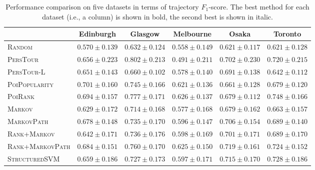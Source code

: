\begin{table}[t]
\caption{Performance comparison on five datasets in terms of trajectory $F_1$-score.
         The best method for each dataset (i.e., a column) is shown in bold, the second best is shown in italic.}
\label{tab:f1}
\centering
\begin{tabular}{l|ccccc} \hline
 & Edinburgh & Glasgow & Melbourne & Osaka & Toronto \\ \hline
\textsc{Random} & $0.570\pm0.139$ & $0.632\pm0.124$ & $0.558\pm0.149$ & $0.621\pm0.117$ & $0.621\pm0.128$ \\
\textsc{PersTour}\cite{ijcai15} & $0.656\pm0.223$ & $\mathbf{0.802\pm0.213}$ & $0.491\pm0.211$ & $0.702\pm0.230$ & $0.720\pm0.215$ \\
\textsc{PersTour-L} & $0.651\pm0.143$ & $0.660\pm0.102$ & $0.578\pm0.140$ & $0.691\pm0.138$ & $0.642\pm0.112$ \\
\textsc{PoiPopularity} & $\mathbf{0.701\pm0.160}$ & $0.745\pm0.166$ & $0.621\pm0.136$ & $0.661\pm0.128$ & $0.679\pm0.120$ \\
\textsc{PoiRank} & $\mathit{0.694\pm0.157}$ & $\mathit{0.777\pm0.171}$ & $\mathbf{0.626\pm0.137}$ & $0.679\pm0.112$ & $\mathbf{0.748\pm0.166}$ \\
\textsc{Markov} & $0.629\pm0.172$ & $0.714\pm0.168$ & $0.577\pm0.168$ & $0.679\pm0.162$ & $0.663\pm0.157$ \\
\textsc{MarkovPath} & $0.678\pm0.148$ & $0.735\pm0.170$ & $0.596\pm0.147$ & $0.706\pm0.154$ & $0.689\pm0.140$ \\
\textsc{Rank+Markov} & $0.642\pm0.171$ & $0.736\pm0.176$ & $0.598\pm0.169$ & $0.701\pm0.171$ & $0.689\pm0.170$ \\
\textsc{Rank+MarkovPath} & $0.684\pm0.151$ & $0.760\pm0.170$ & $\mathit{0.625\pm0.150}$ & $\mathbf{0.719\pm0.161}$ & $0.724\pm0.152$ \\
\textsc{StructuredSVM} & $0.659\pm0.186$ & $0.727\pm0.173$ & $0.597\pm0.171$ & $\mathit{0.715\pm0.170}$ & $\mathit{0.728\pm0.186}$ \\
\hline
\end{tabular}
\end{table}


